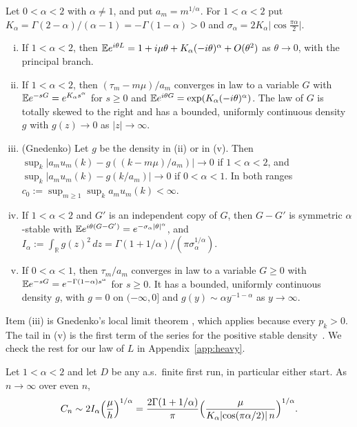 \begin{lemma}\label{lem:stable}
Let $0<\alpha<2$ with $\alpha\ne1$, and put $a_m=m^{1/\alpha}$. For
$1<\alpha<2$ put $K_\alpha=\Gamma(2-\alpha)/(\alpha-1)=-\Gamma(1-\alpha)>0$
and $\sigma_\alpha=2K_\alpha\lvert\cos\frac{\pi\alpha}2\rvert$.
\begin{enumerate}[(i)]
\item If $1<\alpha<2$, then
$\mathbb{E} e^{i\theta L}=1+i\mu\theta+K_\alpha(-i\theta)^\alpha+O(\theta^2)$ as
$\theta\to0$, with the principal branch.
\item If $1<\alpha<2$, then $(\tau_m-m\mu)/a_m$ converges in law to a
variable $G$ with $\mathbb{E} e^{-sG}=e^{K_\alpha s^\alpha}$ for $s\ge0$ and
$\mathbb{E} e^{i\theta G}=\exp(K_\alpha(-i\theta)^\alpha)$. The law of $G$ is totally
skewed to the right and has a bounded, uniformly continuous density $g$ with
$g(z)\to0$ as $\lvert z\rvert\to\infty$.
\item (Gnedenko) Let $g$ be the density in (ii) or in (v). Then
$\sup_k\lvert a_mu_m(k)-g((k-m\mu)/a_m)\rvert\to0$ if $1<\alpha<2$, and
$\sup_k\lvert a_mu_m(k)-g(k/a_m)\rvert\to0$ if $0<\alpha<1$. In both ranges
$c_0:=\sup_{m\ge1}\sup_ka_mu_m(k)<\infty$.
\item If $1<\alpha<2$ and $G'$ is an independent copy of $G$, then $G-G'$ is
symmetric $\alpha$-stable with $\mathbb{E} e^{i\theta(G-G')}=e^{-\sigma_\alpha\lvert
\theta\rvert^\alpha}$, and
$I_\alpha:=\int_{\mathbb R}g(z)^2\,dz=\Gamma(1+1/\alpha)/(\pi\sigma_\alpha^{1/\alpha})$.
\item If $0<\alpha<1$, then $\tau_m/a_m$ converges in law to a variable
$G\ge0$ with $\mathbb{E} e^{-sG}=e^{-\Gamma(1-\alpha)s^\alpha}$ for $s\ge0$. It has a
bounded, uniformly continuous density $g$, with $g=0$ on $(-\infty,0]$ and
$g(y)\sim\alpha y^{-1-\alpha}$ as $y\to\infty$.
\end{enumerate}
\end{lemma}

Item (iii) is Gnedenko's local limit theorem
\cite[Theorem~4.2.1]{ibragimovlinnik1971}, which applies because every
$p_k>0$. The tail in (v) is the first term of the series for the positive
stable density~\cite{pollard1946}. We check the rest for our law of $L$ in
Appendix~\ref{app:heavy}.

\begin{theorem}\label{thm:center}
Let $1<\alpha<2$ and let $D$ be any a.s.\ finite first run, in particular
either start. As $n\to\infty$ over even $n$,
\[
 C_n\sim2I_\alpha\Bigl(\frac{\mu}{h}\Bigr)^{1/\alpha}
 =\frac{2\Gamma(1+1/\alpha)}{\pi}\Bigl(\frac{\mu}{K_\alpha\lvert\cos(\pi
 \alpha/2)\rvert\,n}\Bigr)^{1/\alpha}.
\]
\end{theorem}

